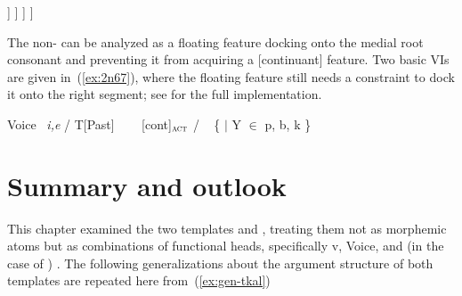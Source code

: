 \begin{exe}
\begin{xlist}
\begin{exe}
\begin{xlist}
\begin{exe}
\begin{xlist}
\begin{exe}
\begin{exe}
\begin{xlist}
\begin{exe}
\begin{xlist}
\begin{exe}
\begin{xlist}
\begin{exe}
\begin{xlist}
\begin{exe}
\begin{xlist}
\begin{exe}
\begin{xlist}
\begin{exe}
\begin{xlist}
\begin{exe}
\begin{xlist}
\begin{xlist}
\begin{exe}
\begin{xlist}
\begin{exe}
\begin{xlist}
\begin{exe}
\begin{xlist}
\begin{exe}
\begin{xlist}
\begin{exe}
\begin{xlist}
\begin{exe}
\begin{xlist}
\begin{exe}
\begin{xlist}
\begin{exe}
\begin{xlist}
\begin{exe}
\begin{xlist}
\begin{exe}
\begin{xlist}
\begin{exe}
\begin{xlist}
\begin{exe}
\begin{xlist}
\begin{xlist}
\begin{xlist}
\begin{exe}
\begin{xlist}
\begin{xlist}
\begin{xlist}
\begin{exe}
\begin{exe}
\begin{xlist}
\begin{exe}
\begin{xlist}
\begin{exe}
\begin{xlist}
\begin{exe}
\begin{xlist}
\begin{exe}
\begin{xlist}
\begin{exe}
\begin{xlist}
\begin{exe}
\begin{xlist}
\begin{exe}
\begin{exe}
\begin{xlist}
\begin{xlist}
\begin{exe}
\begin{xlist}
\begin{exe}
\begin{xlist}
\begin{exe}
\begin{xlist}
\begin{exe}
\begin{xlist}
\begin{exe}
\begin{xlist}
\begin{exe}
\begin{xlist}
\begin{exe}
\begin{exe}
\begin{exe}
\begin{xlist}
\begin{exe}
\begin{xlist}
\begin{exe}
\begin{xlist}
\begin{exe}
\begin{xlist}
\begin{exe}
\begin{xlist}
\begin{exe}
\begin{xlist}
\begin{exe}
\begin{xlist}
            	[.\tikz{\node (va) {\va};} ]
            	[.vP
            		[.\root{XYZ} ]
            		[.{\dots} ]
            	]
         	]
         ]
     ]
 \z
\z 

The non- can be analyzed as a floating feature docking onto the medial root consonant and preventing it from acquiring a [continuant] feature. Two basic VIs are given in~(\ref{ex:2n67}), where the floating feature still needs a constraint to dock it onto the right segment; see \cite{kastner18nllt} for the full implementation.

 \begin{exe}
 \ex  \label{ex:2n67}
 \begin{xlist} 
 	\ex  \label{vi:voice2}	Voice \lra~\emph{i,e} / T[Past] \trace~\va 
	\ex  \label{vi:va}\va~\lra~[\textminus{}cont]$_{\gsc{ACT}}$ / \trace~ \{  $|$ Y $\in$ p, b, k \} 
			
 \z
\z 

\section{Summary and outlook} \label{voice:conc}
This chapter examined the two templates {\tkal} and {\tpie}, treating them not as morphemic atoms but as combinations of functional heads, specifically v, Voice, and (in the case of {\tpie}) {\va}. The following generalizations about the argument structure of both templates are repeated here from~(\ref{ex:gen-tkal}) 
\end{xlist}
\end{exe}
\end{xlist}
\end{exe}
\end{xlist}
\end{exe}
\end{xlist}
\end{exe}
\end{xlist}
\end{exe}
\end{xlist}
\end{exe}
\end{xlist}
\end{exe}
\end{xlist}
\end{exe}
\end{exe}
\end{exe}
\end{xlist}
\end{exe}
\end{xlist}
\end{exe}
\end{xlist}
\end{exe}
\end{xlist}
\end{exe}
\end{xlist}
\end{exe}
\end{xlist}
\end{exe}
\end{xlist}
\end{xlist}
\end{exe}
\end{exe}
\end{xlist}
\end{exe}
\end{xlist}
\end{exe}
\end{xlist}
\end{exe}
\end{xlist}
\end{exe}
\end{xlist}
\end{exe}
\end{xlist}
\end{exe}
\end{xlist}
\end{exe}
\end{exe}
\end{xlist}
\end{xlist}
\end{xlist}
\end{exe}
\end{xlist}
\end{xlist}
\end{xlist}
\end{exe}
\end{xlist}
\end{exe}
\end{xlist}
\end{exe}
\end{xlist}
\end{exe}
\end{xlist}
\end{exe}
\end{xlist}
\end{exe}
\end{xlist}
\end{exe}
\end{xlist}
\end{exe}
\end{xlist}
\end{exe}
\end{xlist}
\end{exe}
\end{xlist}
\end{exe}
\end{xlist}
\end{exe}
\end{xlist}
\end{xlist}
\end{exe}
\end{xlist}
\end{exe}
\end{xlist}
\end{exe}
\end{xlist}
\end{exe}
\end{xlist}
\end{exe}
\end{xlist}
\end{exe}
\end{xlist}
\end{exe}
\end{xlist}
\end{exe}
\end{exe}
\end{xlist}
\end{exe}
\end{xlist}
\end{exe}
\end{xlist}
\end{exe}
